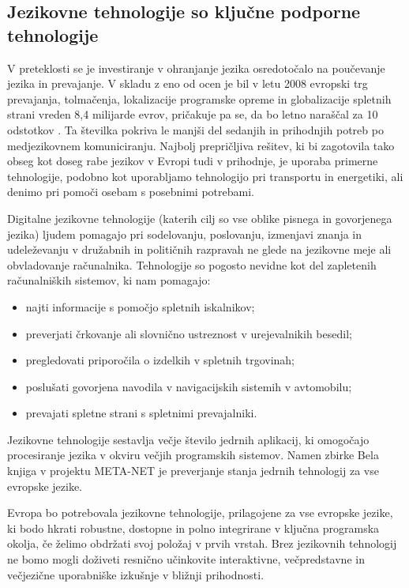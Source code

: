 \begin{multicols}{2}
\subsection{Jezikovne tehnologije so ključne podporne tehnologije}

 V preteklosti se je investiranje v ohranjanje jezika osredotočalo na poučevanje jezika in prevajanje. V skladu z eno od ocen je bil v letu 2008 evropski trg prevajanja, tolmačenja, lokalizacije programske opreme in globalizacije spletnih strani vreden 8,4 mili\-jarde evrov, pričakuje pa se, da bo letno naraščal za 10 odstotkov \cite{EC3}.  Ta številka pokriva le manjši del sedanjih in prihodnjih potreb po medjezikovnem komuniciranju. Naj\-bolj prepričljiva rešitev, ki bi zagotovila tako obseg kot doseg rabe jezikov v Evropi tudi v prihodnje, je uporaba primerne tehnologije, podobno kot uporab\-ljamo tehnologijo pri transportu in energetiki, ali denimo pri pomoči osebam s posebnimi potrebami.


Digitalne jezikovne tehnologije (katerih cilj so vse oblike pisnega in go\-vorjenega jezika) ljudem pomagajo pri sodelovanju, poslovanju, izmenjavi znanja in udeleževanju v družabnih in političnih razpravah ne glede na jezikovne meje ali obvladovanje računalnika. Tehnologije so pogosto nevidne kot del zapletenih računalniških sistemov, ki nam pomagajo:

\begin{itemize}
\item najti informacije s pomočjo spletnih iskalnikov;
\item preverjati črkovanje ali slovnično ustreznost v urejevalnikih besedil;
\item pregledovati priporočila o izdelkih v spletnih trgovinah;
\item poslušati go\-vorjena navodila v navigacij\-skih sistemih v avtomobilu;
\item prevajati spletne strani s spletnimi prevajalniki.
\end{itemize}

Jezikovne tehnologije sestav\-lja večje število jedrnih aplikacij, ki omogočajo procesiranje jezika v okviru večjih programskih sistemov. Namen zbirke Bela knjiga v projektu META-NET je preverjanje stanja jedrnih tehnologij za vse evropske jezike. 

Evropa bo potrebovala jezikovne tehnologije, prilagojene za vse evropske jezike, ki bodo hkrati robustne, dostopne in polno integrirane v ključna programska okolja, če želimo obdržati svoj položaj v prvih vrstah. Brez jezikovnih tehnologij ne bomo mogli doživeti resnično učinkovite interaktivne, večpredstavne in večjezične uporabniške izkušnje v bližnji prihodnosti.


\end{multicols}
